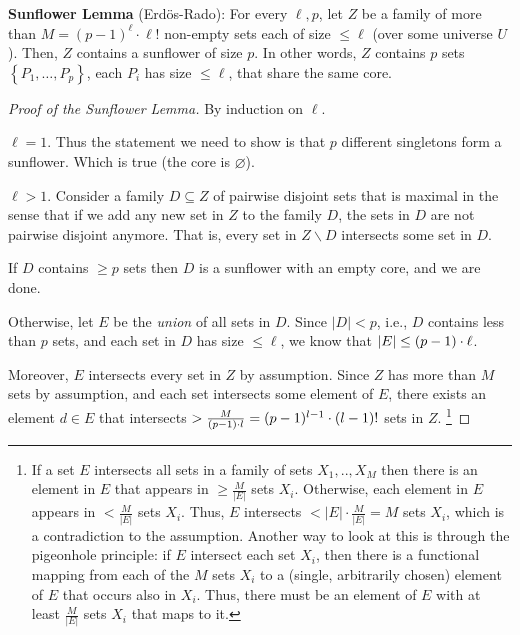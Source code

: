 \begin{svgraybox}
\textbf{Sunflower Lemma} (Erd\"os-Rado): For every $\ell, p$, let $Z$ be a family of more than $M=(p-1)^\ell \cdot \ell!$ non-empty sets each of size $\leq \ell$ (over some universe $U$). Then, $Z$ contains a sunflower of size $p$. In other words, $Z$ contains $p$ sets $\left\{P_1, \ldots, P_p\right\}$, each $P_i$ has size $\leq \ell$, that share the same core. 
\end{svgraybox}



\begin{proof}[Proof of the Sunflower Lemma]
By induction on $\ell$.

\Base  $\ell=1$. Thus the statement we need to show is that $p$ different singletons form a sunflower. Which is true (the core is $\varnothing$).


\induction $\ell>1$. Consider a family $D \subseteq Z$ of pairwise disjoint sets that is maximal in the sense that if we add any new set in $Z$ to the family $D$, the sets in $D$ are not pairwise disjoint anymore. That is, every set in $Z \backslash D$ intersects some set in $D$.

 If $D$ contains $\geq p$ sets then $D$ is a sunflower with an empty core, and we are done.

 Otherwise, let $E$ be the \emph{union} of all sets in $D$.
Since $|D|<p$, i.e., $D$ contains less than $p$ sets, and each set in $D$ has size $\le \ell$, we know that $|E| \leq(p-1)\cdot\ell$.

\medskip 

Moreover, $E$ intersects every set in $Z$ by assumption.
Since $Z$ has more than $M$ sets by assumption, and each set intersects some element of $E$, there exists an element $d \in E$ that intersects $>\frac{M}{(p-1)\cdot l}=(p-1)^{l-1} \cdot(l-1)!$ sets in $Z$.
\footnote{If a set $E$ intersects all sets in a family of sets $X_1, . ., X_M$ then there is an element in $E$ that appears in $\geq \frac{M}{|E|}$ sets $X_i$.
Otherwise, each element in $E$ appears in $<\frac{M}{|E|}$ sets $X_i$. Thus, $E$ intersects $<|E| \cdot \frac{M}{|E|}=M$ sets $X_i$, which is a contradiction to the assumption. Another way to look at this is through the pigeonhole principle: if $E$ intersect each set $X_i$, then there is a functional mapping from each of the $M$ sets $X_i$ to a (single, arbitrarily chosen) element of $E$ that occurs also in $X_i$. Thus, there must be an element of $E$ with at least $\frac{M}{|E|}$ sets $X_i$ that maps to it.}


\end{proof}
